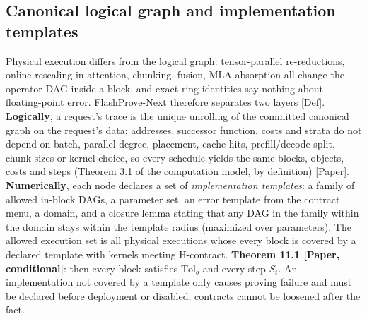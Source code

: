 \documentclass[10pt]{article}
\begin{document}
\subsection{Canonical logical graph and implementation templates}
Physical execution differs from the logical graph: tensor-parallel re-reductions, online rescaling in attention, chunking, fusion, MLA absorption all change the operator DAG inside a block, and exact-ring identities say nothing about floating-point error. FlashProve-Next therefore separates two layers [Def]. \textbf{Logically}, a request's trace is the unique unrolling of the committed canonical graph on the request's data; addresses, successor function, costs and strata do not depend on batch, parallel degree, placement, cache hits, prefill/decode split, chunk sizes or kernel choice, so every schedule yields the same blocks, objects, costs and steps (Theorem 3.1 of the computation model, by definition) [Paper]. \textbf{Numerically}, each node declares a set of \emph{implementation templates}: a family of allowed in-block DAGs, a parameter set, an error template from the contract menu, a domain, and a closure lemma stating that any DAG in the family within the domain stays within the template radius (maximized over parameters). The allowed execution set is all physical executions whose every block is covered by a declared template with kernels meeting H-contract. \textbf{Theorem 11.1 [Paper, conditional]}: then every block satisfies $\mathrm{Tol}_b$ and every step $S_t$. An implementation not covered by a template only causes proving failure and must be declared before deployment or disabled; contracts cannot be loosened after the fact.
\end{document}
